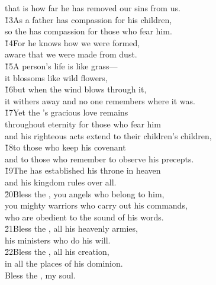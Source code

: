 \begin{poetry}
\poemll    that is how far he has removed our sins from us. \\
\poeml \v{13}As a father has compassion for his children, \\
\poemll    so the  has compassion for those who fear him. \\
\poeml \v{14}For he knows how we were formed, \\
\poemll    aware that we were made from dust. \\
\poeml \v{15}A person's life is like grass--- \\
\poemll    it blossoms like wild flowers, \\
\poeml \v{16}but when the wind blows through it, \\
\poemll    it withers away and no one remembers where it was. \\
\poeml \v{17}Yet the 's gracious love remains \\
\poemll    throughout eternity for those who fear him \\
\poemlll       and his righteous acts extend to their children's children, \\
\poeml \v{18}to those who keep his covenant \\
\poemll    and to those who remember to observe his precepts. \\
\poeml \v{19}The  has established his throne in heaven \\
\poemll    and his kingdom rules over all. \\
\poeml \v{20}Bless the , you angels who belong to him, \\
\poemll    you mighty warriors who carry out his commands, \\
\poemlll       who are obedient to the sound of his words. \\
\poeml \v{21}Bless the , all his heavenly armies, \\
\poemll    his ministers who do his will. \\
\poeml \v{22}Bless the , all his creation, \\
\poemll    in all the places of his dominion. \\
\poeml Bless the , my soul.
\end{poetry}

